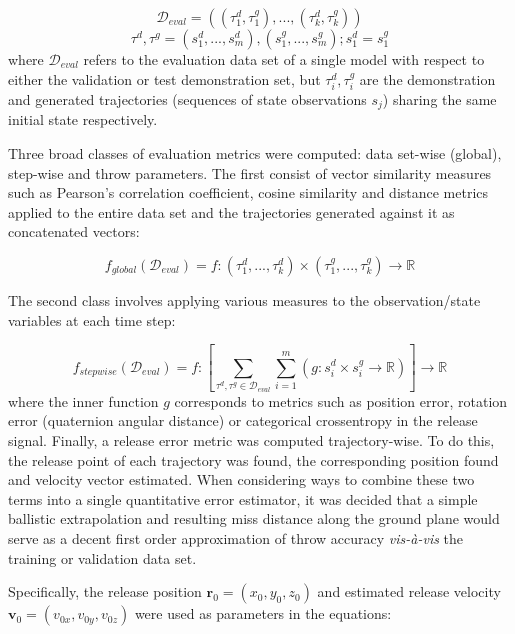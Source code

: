 \documentclass{article}
\begin{document}
\begin{equation}
	\mathcal{D}_{eval} = \left ( (\tau^d_{1}, \tau^g_{1}), ..., (\tau^d_{k}, \tau^g_{k}) \right )
\end{equation}
\begin{equation}
	\tau^d, \tau^g = (s^d_1, ..., s^d_m), (s^g_1, ..., s^g_m); s^d_1 = s^g_1 
\end{equation}
where $\mathcal{D}_{eval}$ refers to the evaluation data set of a single model with respect to either the validation or test demonstration set, but $\tau^d_i, \tau^g_i$ are the demonstration and generated trajectories (sequences of state observations $s_j$) sharing the same initial state respectively.

Three broad classes of evaluation metrics were computed: data set-wise (global), step-wise and throw parameters. The first consist of vector similarity measures such as Pearson's correlation coefficient, cosine similarity and distance metrics applied to the entire data set and the trajectories generated against it as concatenated vectors:

\begin{equation}
	f_{global}(\mathcal{D}_{eval}) = f:(\tau^d_{1},...,\tau^d_{k}) \times (\tau^g_{1},...,\tau^g_{k}) \rightarrow \mathbb{R}
\end{equation}

The second class involves applying various measures to the observation/state variables at each time step:

\begin{equation}
	f_{stepwise}(\mathcal{D}_{eval}) = f: \left [ \sum_{\tau^d, \tau^g \in \mathcal{D}_{eval}}\sum_{i=1}^m \left ( g:s^d_i \times s^g_i \rightarrow \mathbb{R} \right ) \right ] \rightarrow \mathbb{R}
\end{equation}
where the inner function $g$ corresponds to metrics such as position error, rotation error (quaternion angular distance) or categorical crossentropy in the release signal. Finally, a release error metric was computed trajectory-wise. To do this, the release point of each trajectory was found, the corresponding position found and velocity vector estimated. When considering ways to combine these two terms into a single quantitative error estimator, it was decided that a simple ballistic extrapolation and resulting miss distance along the ground plane would serve as a decent first order approximation of throw accuracy \emph{vis-à-vis} the training or validation data set.

Specifically, the release position $\mathbf{r}_0 = (x_0,y_0,z_0)$ and estimated release velocity $\mathbf{v}_0 = (v_{0x}, v_{0y}, v_{0z})$ were used as parameters in the equations:
\end{document}
